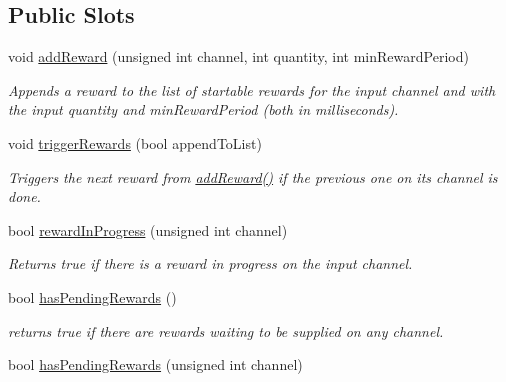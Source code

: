 \subsection*{Public Slots}
\begin{DoxyCompactItemize}
\item 
void \hyperlink{class_picto_1_1_reward_controller_a287522c7b84e646e85f5aa85dc49bb74}{add\-Reward} (unsigned int channel, int quantity, int min\-Reward\-Period)
\begin{DoxyCompactList}\small\item\em Appends a reward to the list of startable rewards for the input channel and with the input quantity and min\-Reward\-Period (both in milliseconds). \end{DoxyCompactList}\item 
void \hyperlink{class_picto_1_1_reward_controller_ae9f9b5b07f824d9078b30cb116ff3323}{trigger\-Rewards} (bool append\-To\-List)
\begin{DoxyCompactList}\small\item\em Triggers the next reward from \hyperlink{class_picto_1_1_reward_controller_a287522c7b84e646e85f5aa85dc49bb74}{add\-Reward()} if the previous one on its channel is done. \end{DoxyCompactList}\item 
\hypertarget{class_picto_1_1_reward_controller_adbcbd4e26643a6a789ebde84711ea336}{bool \hyperlink{class_picto_1_1_reward_controller_adbcbd4e26643a6a789ebde84711ea336}{reward\-In\-Progress} (unsigned int channel)}\label{class_picto_1_1_reward_controller_adbcbd4e26643a6a789ebde84711ea336}

\begin{DoxyCompactList}\small\item\em Returns true if there is a reward in progress on the input channel. \end{DoxyCompactList}\item 
\hypertarget{class_picto_1_1_reward_controller_abf881b86a594bb618c2901e210d457e5}{bool \hyperlink{class_picto_1_1_reward_controller_abf881b86a594bb618c2901e210d457e5}{has\-Pending\-Rewards} ()}\label{class_picto_1_1_reward_controller_abf881b86a594bb618c2901e210d457e5}

\begin{DoxyCompactList}\small\item\em returns true if there are rewards waiting to be supplied on any channel. \end{DoxyCompactList}\item 
\hypertarget{class_picto_1_1_reward_controller_a4380a9f16f4490377ae618096b61ffd1}{bool \hyperlink{class_picto_1_1_reward_controller_a4380a9f16f4490377ae618096b61ffd1}{has\-Pending\-Rewards} (unsigned int channel)}\label{class_picto_1_1_reward_controller_a4380a9f16f4490377ae618096b61ffd1}


\end{DoxyCompactItemize}
